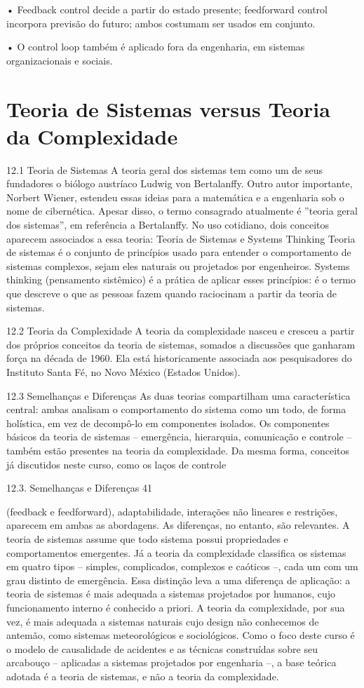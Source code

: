 • Feedback control decide a partir do estado presente; feedforward control incorpora previsão do futuro; ambos costumam ser usados em conjunto.

• O control loop também é aplicado fora da engenharia, em sistemas organizacionais e sociais.

\chapter{Teoria de Sistemas versus Teoria da Complexidade}

12.1 Teoria de Sistemas A teoria geral dos sistemas tem como um de seus fundadores o biólogo austríaco Ludwig von Bertalanffy. Outro autor importante, Norbert Wiener, estendeu essas ideias para a matemática e a engenharia sob o nome de cibernética. Apesar disso, o termo consagrado atualmente é ”teoria geral dos sistemas”, em referência a Bertalanffy. No uso cotidiano, dois conceitos aparecem associados a essa teoria: Teoria de Sistemas e Systems Thinking Teoria de sistemas é o conjunto de princípios usado para entender o comportamento de sistemas complexos, sejam eles naturais ou projetados por engenheiros. Systems thinking (pensamento sistêmico) é a prática de aplicar esses princípios: é o termo que descreve o que as pessoas fazem quando raciocinam a partir da teoria de sistemas.

12.2 Teoria da Complexidade A teoria da complexidade nasceu e cresceu a partir dos próprios conceitos da teoria de sistemas, somados a discussões que ganharam força na década de 1960. Ela está historicamente associada aos pesquisadores do Instituto Santa Fé, no Novo México (Estados Unidos).

12.3 Semelhanças e Diferenças As duas teorias compartilham uma característica central: ambas analisam o comportamento do sistema como um todo, de forma holística, em vez de decompô-lo em componentes isolados. Os componentes básicos da teoria de sistemas – emergência, hierarquia, comunicação e controle – também estão presentes na teoria da complexidade. Da mesma forma, conceitos já discutidos neste curso, como os laços de controle

12.3. Semelhanças e Diferenças 41

(feedback e feedforward), adaptabilidade, interações não lineares e restrições, aparecem em ambas as abordagens. As diferenças, no entanto, são relevantes. A teoria de sistemas assume que todo sistema possui propriedades e comportamentos emergentes. Já a teoria da complexidade classifica os sistemas em quatro tipos – simples, complicados, complexos e caóticos –, cada um com um grau distinto de emergência. Essa distinção leva a uma diferença de aplicação: a teoria de sistemas é mais adequada a sistemas projetados por humanos, cujo funcionamento interno é conhecido a priori. A teoria da complexidade, por sua vez, é mais adequada a sistemas naturais cujo design não conhecemos de antemão, como sistemas meteorológicos e sociológicos. Como o foco deste curso é o modelo de causalidade de acidentes e as técnicas construídas sobre seu arcabouço – aplicadas a sistemas projetados por engenharia –, a base teórica adotada é a teoria de sistemas, e não a teoria da complexidade.

